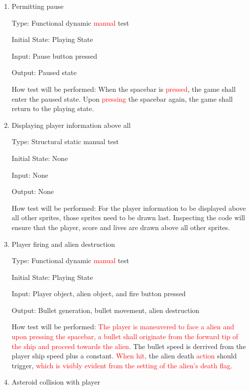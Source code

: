 \documentclass[12pt, titlepage]{article}
\begin{document}
\begin{enumerate}

\item{Permitting pause\\}

Type: Functional dynamic \textcolor{red}{manual} test

Initial State: Playing State

Input: Pause button pressed

Output: Paused state

How test will be performed: When the spacebar is \textcolor{red}{pressed}, the game shall enter the paused state. Upon \textcolor{red}{pressing} the spacebar again, the game shall return to the playing state.

\item{Displaying player information above all\\}

Type: Structural static manual test

Initial State: None

Input: None

Output: None

How test will be performed: For the player information to be displayed above all other sprites, those sprites need to be drawn last. Inspecting the code will ensure that the player, score and lives are drawn above all other sprites.

\item{Player firing and alien destruction\\}

Type: Functional dynamic \textcolor{red}{manual} test

Initial State: Playing State

Input: Player object, alien object, and fire button pressed

Output: Bullet generation, bullet movement, alien destruction

How test will be performed: \textcolor{red}{The player is maneuvered to face a alien and upon pressing the spacebar, a bullet shall originate from the forward tip of the ship and proceed towards the alien.} The bullet speed is derrived from the player ship speed plus a constant. \textcolor{red}{When hit,} the alien death \textcolor{red}{action} should trigger, \textcolor{red}{which is visibly evident from the setting of the alien's death flag.}

\item{Asteroid collision with player\\}


\end{enumerate}
\end{document}
